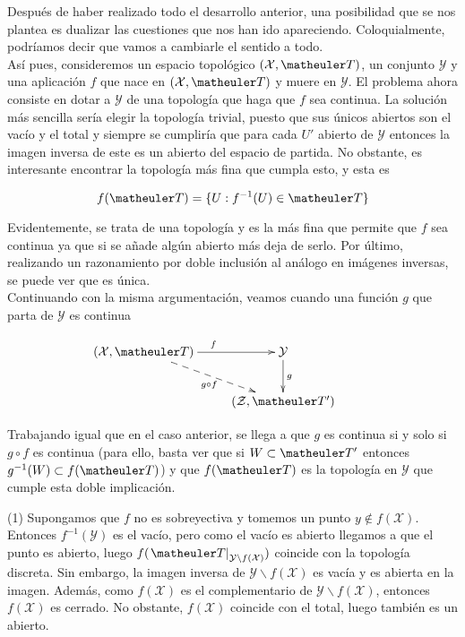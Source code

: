 Después de haber realizado todo el desarrollo anterior, una posibilidad que se nos plantea es dualizar las cuestiones que nos han ido apareciendo. Coloquialmente, podríamos decir que vamos a cambiarle el sentido a todo. \\

Así pues, consideremos un espacio topológico $(\mathcal{X},\T)$, un conjunto $\mathcal{Y}$ y una aplicación $f$ que nace en $(\mathcal{X},\T)$ y muere en $\mathcal{Y}$. El problema ahora consiste en dotar a $\mathcal{Y}$ de una topología que haga que $f$ sea continua. La solución más sencilla sería elegir la topología trivial, puesto que sus únicos abiertos son el vacío y el total y siempre se cumpliría que para cada $U'$ abierto de $\mathcal{Y}$ entonces la imagen inversa de este es un abierto del espacio de partida. No obstante, es interesante encontrar la topología más fina que cumpla esto, y esta es 

\[f(\T)=\{U: f^{-1}(U)\in \T\}\]

Evidentemente, se trata de una topología y es la más fina que permite que $f$ sea continua ya que si se añade algún abierto más deja de serlo. Por último, realizando un razonamiento por doble inclusión al análogo en imágenes inversas, se puede ver que es única. \\

Continuando con la misma argumentación, veamos cuando una función $g$ que parta de $\mathcal{Y}$ es continua

\begin{equation}
\label{cont_propiedad_universal_top_imagen}
\xymatrix{
(\mathcal{X},\T) \ar[r]^f \ar@{-->}[rd]_{g\circ f} &
\mathcal{Y} \ar[d]^g & \\
&(\mathcal{Z},\T')}
\end{equation}

Trabajando igual que en el caso anterior, se llega a que $g$ es continua si y solo si $g\circ f$ es continua (para ello, basta ver que si $W\subset \T'$ entonces $g^{-1}(W)\subset f(\T)$) y que $f(\T)$ es la topología en $\mathcal{Y}$ que cumple esta doble implicación. \\

\begin{obs}[Sobreyectividad]

(1) Supongamos que $f$ no es sobreyectiva y tomemos un punto $y\notin f(\mathcal{X})$. Entonces $f^{-1}(\mathcal{Y})$ es el vacío, pero como el vacío es abierto llegamos a que el punto es abierto, luego $f(\left.\T\right|_{\mathcal{Y}\backslash f(\mathcal{X})})$ coincide con la topología discreta. Sin embargo, la imagen inversa de $\mathcal{Y}\backslash f(\mathcal{X})$ es vacía y es abierta en la imagen. Además, como $f(\mathcal{X})$ es el complementario de $\mathcal{Y}\backslash f(\mathcal{X})$, entonces $f(\mathcal{X})$ es cerrado. No obstante, $f(\mathcal{X})$ coincide con el total, luego también es un abierto. 

\end{obs}